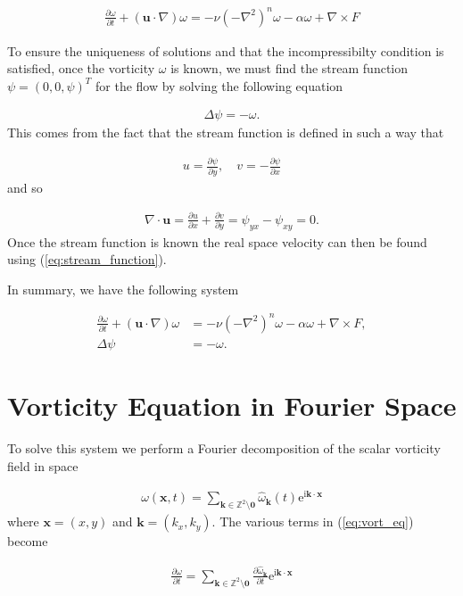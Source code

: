 \documentclass[9pt]{article}
\newcommand{\pder}[2]{\frac{\partial #1}{\partial #2}}               %
\newcommand{\ii}{\mathrm{i}}      								  %
\newcommand{\e}{\mathrm{e}}      								  %
\newcommand{\curl}[1]{\nabla \times {#1}}								%
\newcommand{\bfu}{\mathbf{u}}											%
\newcommand{\omegahat}[1]{\hat{\omega}_{ \mathbf{#1} } }								%
\newcommand{\bfx}{\mathbf{x}}								%
\newcommand{\bfk}{\mathbf{k}}								%
\begin{document}
\begin{align}
	\pder{\omega}{t} + \left(\bfu \cdot \nabla\right)\omega = - \nu (-\nabla^2)^n \omega - \alpha \omega +  \curl{F}
\end{align}

To ensure the uniqueness of solutions and that the incompressibilty condition is satisfied, once the vorticity $\omega$ is known, we must find the stream function $\psi = (0, 0, \psi)^T$ for the flow by solving the following equation

\begin{align}
	\Delta\psi = -\omega.
\end{align}
This comes from the fact that the stream function is defined in such a way that 

\begin{align}
	u = \pder{\psi}{y}, \quad v = -\pder{\psi}{x}
	\label{eq:stream_function}
\end{align}
and so

\begin{align}
\nabla \cdot \bfu = \pder{u}{x} + \pder{v}{y} = \psi_{y x}-\psi_{x y}=0.
\end{align}
Once the stream function is known the real space velocity can then be found using (\ref{eq:stream_function}).

In summary, we have the following system

\begin{align}
	\pder{\omega}{t} + \left(\bfu \cdot \nabla\right)\omega &= -\nu (-\nabla^2)^n\omega - \alpha \omega +  \curl{F}, \label{eq:vort_eq}\\
	\Delta\psi &= -\omega. \label{eq:laplace}
\end{align}


\section{Vorticity Equation in Fourier Space}

To solve this system we perform a Fourier decomposition of the scalar vorticity field in space

\begin{align}
	\omega(\mathbf{x}, t) = \sum_{\mathbf{k}\in \mathbb{Z}^2\setminus \mathbf{0}}\hat{\omega}_{\mathbf{k}}(t)\e^{\ii \mathbf{k}\cdot \mathbf{x}}
	\label{eq:fourier_decomp}
\end{align}
where $\bfx = (x, y)$ and $\bfk = (k_x, k_y)$. The various terms in (\ref{eq:vort_eq}) become

\begin{align}
	\pder{\omega}{t} = \sum_{\bfk \in \mathbb{Z}^2\setminus \mathbf{0}} \pder{\omegahat{k}}{t} \e^{\ii \mathbf{k}\cdot \mathbf{x}}
\end{align}
\end{document}
